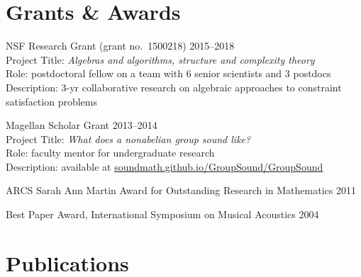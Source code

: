 \documentclass[margin,line]{resume}
\begin{document}
\begin{resume}
    \vspace{-1mm}
    \section{\mysidestyle Grants \& Awards}

    NSF Research Grant {\small (grant no.~1500218)} \hfill 2015--2018\\
    Project Title: \textsl{Algebras and algorithms, structure and complexity theory}\\ 
    Role: postdoctoral fellow on a team with 6 senior scientists and 3 postdocs\\
    Description: 3-yr collaborative research on algebraic approaches to constraint satisfaction problems

    \vspace{-1mm}
    Magellan Scholar Grant \hfill     2013--2014\\
    Project Title: \textsl{What does a nonabelian group sound like?}\\
    Role: faculty mentor for undergraduate research\\
    Description: available at {\small \href{http://soundmath.github.io/GroupSound/}{soundmath.github.io/GroupSound/GroupSound}}

    \vspace{-2mm}
    ARCS Sarah Ann Martin Award for Outstanding Research in Mathematics \hfill 2011

    \vspace{-2mm}
    Best Paper Award, International Symposium on Musical Acoustics \hfill  2004 

\vskip-2mm
    \section{\mysidestyle Publications}

    
    
    \newpage

~\vspace{-15mm}



\end{resume}
\end{document}

